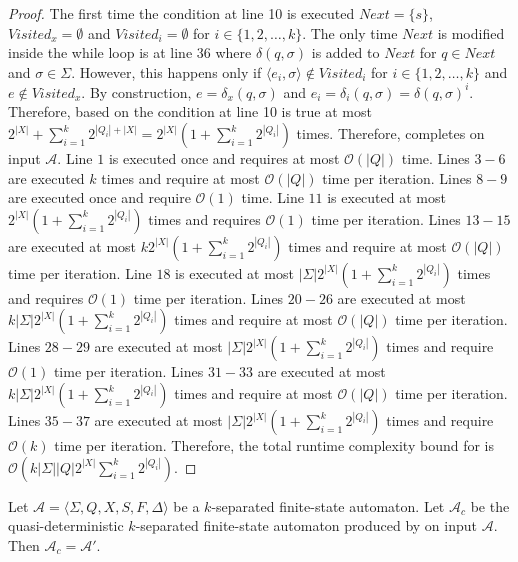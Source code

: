   \begin{proof}
    The first time the condition at line 10 is executed $Next = \{ s \}$,
    $Visited_x = \emptyset$ and $Visited_i = \emptyset$ for $i \in
      \{ 1, 2, \ldots, k \}$. The only time $Next$ is modified inside the while loop is
    at line 36 where $\delta(q, \sigma)$ is added to $Next$ for $q \in Next$ and
    $\sigma \in \Sigma$. However, this happens only if $\langle e_i, \sigma
      \rangle \not\in Visited_i$ for $i \in \{ 1, 2, \ldots, k \}$ and $e \not\in
      Visited_x$. By construction, $e = \delta_x(q, \sigma)$ and $e_i =
      \delta_i(q, \sigma) = \delta(q, \sigma)^i$. Therefore, based on
     the condition at line 10
    is true at most $2^{|X|} + \sum_{i=1}^k 2^{|Q_i| + |X|} = 2^{|X|}(1 +
      \sum_{i=1}^k 2^{|Q_i|})$ times. Therefore, 
    completes on input $\mathcal{A}$.
    Line $1$ is executed once and requires at most $\mathcal{O}(|Q|)$ time.
    Lines $3-6$ are executed $k$ times and require at most $\mathcal{O}(|Q|)$
    time per iteration. Lines $8-9$ are executed once and require
    $\mathcal{O}(1)$ time. Line $11$ is executed at most $2^{|X|} (1 +
      \sum_{i=1}^k 2^{|Q_i|})$ times and requires $\mathcal{O}(1)$ time per
    iteration. Lines $13-15$ are executed at most $k 2^{|X|} (1 + \sum_{i=1}^k
      2^{|Q_i|})$ times and require at most $\mathcal{O}(|Q|)$ time per iteration.
    Line $18$ is executed at most $|\Sigma| 2^{|X|} (1 + \sum_{i=1}^k 2^{|Q_i|})$
    times and requires $\mathcal{O}(1)$ time per iteration. Lines $20-26$ are
    executed at most $k |\Sigma| 2^{|X|} (1 + \sum_{i=1}^k 2^{|Q_i|})$ times and
    require at most $\mathcal{O}(|Q|)$ time per iteration. Lines $28-29$ are
    executed at most $|\Sigma| 2^{|X|} (1 + \sum_{i=1}^k 2^{|Q_i|})$ times and
    require $\mathcal{O}(1)$ time per iteration. Lines $31-33$ are executed at
    most $k |\Sigma| 2^{|X|} (1 + \sum_{i=1}^k 2^{|Q_i|})$ times and require at
    most $\mathcal{O}(|Q|)$ time per iteration. Lines $35-37$ are executed at
    most $|\Sigma| 2^{|X|} (1 + \sum_{i=1}^k 2^{|Q_i|})$ times and require
    $\mathcal{O}(k)$ time per iteration. Therefore, the total runtime complexity
    bound for  is $\mathcal{O}(k |\Sigma| |Q|
      2^{|X|} \sum_{i=1}^k 2^{|Q_i|})$.
  \end{proof}

  \begin{proposition}
    Let $\mathcal{A} = \langle \Sigma, Q, X, S, F, \Delta \rangle$ be a
    $k$-separated finite-state automaton. Let $\mathcal{A}_c$ be the
    quasi-deterministic $k$-separated finite-state automaton produced by
     on input $\mathcal{A}$. Then
    $\mathcal{A}_c = \mathcal{A}'$.
  \end{proposition}

